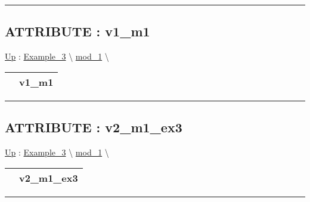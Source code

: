 \rule{\linewidth}{0.5pt}

\subsection*{ATTRIBUTE : v1\_m1}
\hypertarget{ecldoc:intest.example_3.mod_1.v1_m1}{}
\hyperlink{ecldoc:intest.Example_3.mod_1}{Up} :
\hspace{0pt} \hyperlink{ecldoc:intest.Example_3}{Example_3} \textbackslash 
\hspace{0pt} \hyperlink{ecldoc:intest.Example_3.mod_1}{mod_1} \textbackslash 

{\renewcommand{\arraystretch}{1.5}
\begin{tabularx}{\textwidth}{|>{\raggedright\arraybackslash}l|X|}
\hline
\hspace{0pt} & v1\_m1 \\
\hline
\end{tabularx}
}

\par


\rule{\linewidth}{0.5pt}
\subsection*{ATTRIBUTE : v2\_m1\_ex3}
\hypertarget{ecldoc:intest.example_3.mod_1.v2_m1_ex3}{}
\hyperlink{ecldoc:intest.Example_3.mod_1}{Up} :
\hspace{0pt} \hyperlink{ecldoc:intest.Example_3}{Example_3} \textbackslash 
\hspace{0pt} \hyperlink{ecldoc:intest.Example_3.mod_1}{mod_1} \textbackslash 

{\renewcommand{\arraystretch}{1.5}
\begin{tabularx}{\textwidth}{|>{\raggedright\arraybackslash}l|X|}
\hline
\hspace{0pt} & v2\_m1\_ex3 \\
\hline
\end{tabularx}
}

\par


\rule{\linewidth}{0.5pt}




